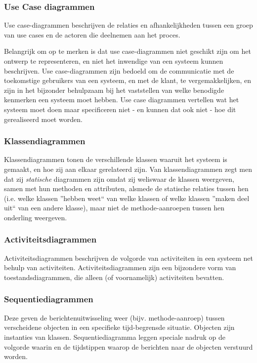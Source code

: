 \subsubsection{Use Case diagrammen}
Use case-diagrammen beschrijven de relaties en afhankelijkheden tussen een groep van use cases en de actoren die deelnemen aan het proces.

Belangrijk om op te merken is dat use case-diagrammen niet geschikt zijn om het ontwerp te representeren, en niet het inwendige van een systeem kunnen beschrijven. Use case-diagrammen zijn bedoeld om de communicatie met de toekomstige gebruikers van een systeem, en met de klant, te vergemakkelijken, en zijn in het bijzonder behulpzaam bij het vaststellen van welke benodigde kenmerken een systeem moet hebben. Use case diagrammen vertellen wat het systeem moet doen maar specificeren niet - en kunnen dat ook niet - hoe dit gerealiseerd moet worden.

\subsubsection{Klassendiagrammen}
Klassendiagrammen tonen de verschillende klassen waaruit het systeem is gemaakt, en hoe zij aan elkaar gerelateerd zijn. Van klassendiagrammen zegt men dat zij \textit{statische} diagrammen zijn omdat zij weliswaar de klassen weergeven, samen met hun methoden en attributen, alsmede de statische relaties tussen hen (i.e. welke klassen ''hebben weet`` van welke klassen of welke klassen ''maken deel uit`` van een andere klasse), maar niet de methode-aanroepen tussen hen onderling weergeven. 

\subsubsection{Activiteitsdiagrammen}
Activiteitsdiagrammen beschrijven de volgorde van activiteiten in een systeem net behulp van activiteiten. Activiteitsdiagrammen zijn een bijzondere vorm van toestandsdiagrammen, die alleen (of voornamelijk) activiteiten bevatten. 

\subsubsection{Sequentiediagrammen}
Deze geven de berichtenuitwisseling weer (bijv. methode-aanroep) tussen verscheidene objecten in een specifieke tijd-begrensde situatie. Objecten zijn instanties van klassen. Sequentiediagramma leggen speciale nadruk op de volgorde waarin en de tijdstippen waarop de berichten naar de objecten verstuurd worden.

